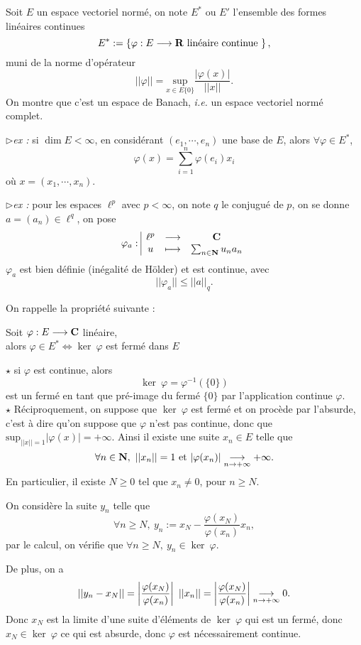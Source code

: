 \documentclass[a4paper,11pt, twoside]{article}
\begin{document}
Soit $E$ un espace vectoriel normé, on note $E^*$ ou $E'$ l'ensemble des formes linéaires continues
$$E^*:=\left\{\varphi:E\longrightarrow \mathbf R\text{ linéaire continue }\right\},$$ 
muni de la norme d'opérateur 
$$||\varphi||=\underset{x\in E\{0\}}{\mathrm{sup}}\frac{|\varphi(x)|}{||x||}.$$
On montre que c'est un espace de Banach, \emph{i.e.} un espace vectoriel normé complet.

$\triangleright$\emph{ex : }si $\dim E<\infty$, en considérant $(e_1,\cdots, e_n)$ une base de $E$, alors $\forall \varphi\in E^*$,
$$\varphi(x)=\sum_{i=1}^n\varphi(e_i)x_i$$
où $x=(x_1,\cdots,x_n)$.

$\triangleright$\emph{ex : }pour les espaces $\ell^p$ avec $p<\infty$, on note $q$ le conjugué de $p$, on se donne $a=\left(a_n\right)\in\ell^q$, on pose 
$$\varphi_a:\begin{array}{|ccc}
  \ell^p&\longrightarrow&\mathbf C\\
  u&\longmapsto&\sum_{n\in\mathbf N}u_na_n 
\end{array}$$
$\varphi_a$ est bien définie (inégalité de Hölder) et est continue, avec 
$$||\varphi_a||\leqslant ||a||_q.$$

On rappelle la propriété suivante : 


\begin{prop}
  Soit $\varphi:E\longrightarrow \mathbf C$ linéaire,\\

  alors $\varphi\in E^*\Leftrightarrow\ker\ \varphi$ est fermé dans $E$
\end{prop}


\begin{Proof}
  $\star$ si $\varphi$ est continue, alors 
  $$\ker\ \varphi=\varphi^{-1}(\{0\})$$
  est un fermé en tant que pré-image du fermé $\{0\}$ par l'application continue $\varphi$.\\

  $\star$ Réciproquement, on suppose que $\ker\ \varphi$ est fermé et on procède par l'absurde, c'est à dire qu'on suppose que $\varphi$ n'est pas continue, donc que $\mathrm{sup}_{||x||=1}|\varphi(x)|=+\infty$. Ainsi il existe une  suite $x_n\in E$ telle que 
  $$\forall n\in \mathbf N,\ ||x_n||=1\text{ et }|\varphi(x_n)|\underset{n\to+\infty}{\longrightarrow} +\infty.$$
  En particulier, il existe $N\geqslant 0$ tel que $x_n\neq 0$, pour $n\geqslant N$.

  On considère la suite $y_n$ telle que 
  $$\forall n\geqslant N,\ y_n:=x_N-\frac{\varphi(x_N)}{\varphi(x_n)}x_n,$$
  par le calcul, on vérifie que $\forall n\geqslant N,\ y_n\in\ker\ \varphi$.

  De plus, on a 
  $$||y_n-x_N||=\left|\frac{\varphi(x_N)}{\varphi(x_n)}\right|\ ||x_n||=\left|\frac{\varphi(x_N)}{\varphi(x_n)}\right|\tend 0.$$
  Donc $x_N$ est la limite d'une suite d'éléments de $\ker\ \varphi$ qui est un fermé, donc $x_N\in\ker\ \varphi$ ce qui est absurde, donc $\varphi$ est nécessairement continue.
\end{Proof}
\end{document}

